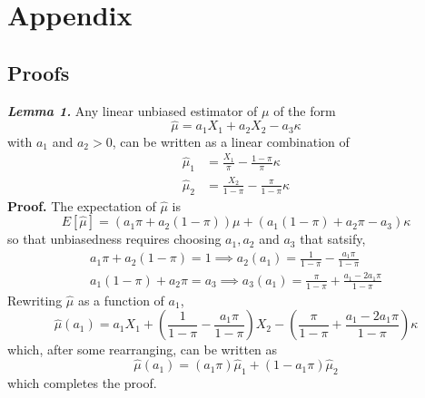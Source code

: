 \documentclass[12pt]{article}
\begin{document}
\newpage

\singlespacing
 


\newpage
\doublespacing

\section{Appendix}

\subsection{Proofs}
\noindent \textit{\textbf{Lemma 1.}} Any linear unbiased estimator of $\mu$ of the form
\begin{equation}
\hat{\mu} = a_1X_{1} + a_2 X_2 -  a_3 \kappa \label{mu} \end{equation}
with $a_1$ and $a_2 >0$, can be written as a linear combination of 
\begin{align*}
\hat{\mu}_1 &= \frac{X_1}{\pi} - \frac{1-\pi}{\pi} \kappa \\
\hat{\mu}_2 &= \frac{X_2}{1-\pi} - \frac{\pi}{1-\pi}\kappa 
\end{align*}
\textbf{Proof.} The expectation of $\hat{\mu}$ is 
$$ E[\hat{\mu}] = (a_1 \pi + a_2 (1-\pi))\mu + (a_1(1-\pi)+a_2\pi - a_3)\kappa $$
so that unbiasedness requires choosing $a_1, a_2$ and $a_3$ that satsify,
\begin{gather}
    a_1\pi + a_2(1-\pi) = 1 \implies a_2(a_1) = \frac{1}{1-\pi} - \frac{a_1 \pi}{1-\pi} \\
    a_1 (1-\pi) + a_2 \pi = a_3 \implies a_3(a_1) = \frac{\pi}{1-\pi}  + \frac{a_1 - 2a_1 \pi}{1-\pi} 
\end{gather}
Rewriting $\hat{\mu}$ as a function of $a_1$,  
 $$\hat{\mu}(a_1) = a_1 X_1 +  \left(\frac{1}{1-\pi} - \frac{a_1 \pi}{1-\pi}\right)  X_2 - \left(\frac{\pi}{1-\pi} + \frac{a_1 - 2a_1\pi}{1-\pi}\right)\kappa $$ 
which, after some rearranging, can be written as
$$\hat{\mu}(a_1) = (a_1 \pi) \hat{\mu}_1 + (1-a_1\pi) \hat{\mu}_2 $$
which completes the proof.  
\end{document}
